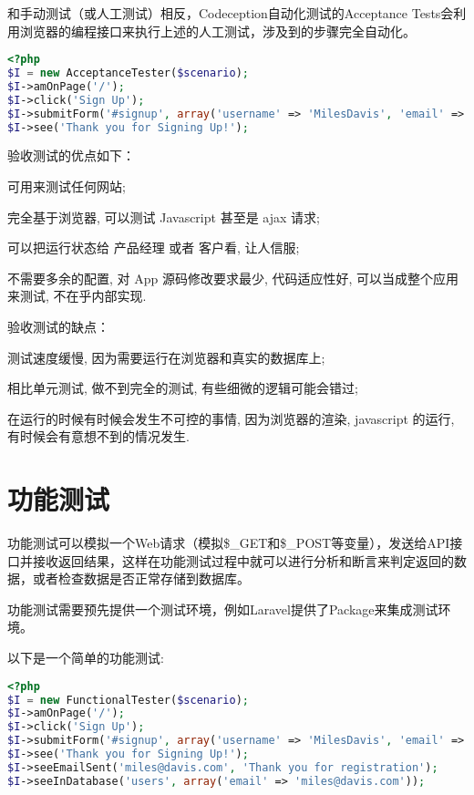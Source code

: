 和手动测试（或人工测试）相反，Codeception自动化测试的Acceptance Tests会利用浏览器的编程接口来执行上述的人工测试，涉及到的步骤完全自动化。


\begin{lstlisting}[language=PHP]
<?php
$I = new AcceptanceTester($scenario);
$I->amOnPage('/');
$I->click('Sign Up');
$I->submitForm('#signup', array('username' => 'MilesDavis', 'email' => 'miles@davis.com'));
$I->see('Thank you for Signing Up!');
\end{lstlisting}

验收测试的优点如下：

\begin{compactitem}
\item 可用来测试任何网站;
\item 完全基于浏览器, 可以测试 Javascript 甚至是 ajax 请求;
\item 可以把运行状态给 产品经理 或者 客户看, 让人信服;
\item 不需要多余的配置, 对 App 源码修改要求最少, 代码适应性好, 可以当成整个应用来测试, 不在乎内部实现.
\end{compactitem}

验收测试的缺点：

\begin{compactitem}
\item 测试速度缓慢, 因为需要运行在浏览器和真实的数据库上;
\item 相比单元测试, 做不到完全的测试, 有些细微的逻辑可能会错过;
\item 在运行的时候有时候会发生不可控的事情, 因为浏览器的渲染, javascript 的运行, 有时候会有意想不到的情况发生.
\end{compactitem}



\section{功能测试}


功能测试可以模拟一个Web请求（模拟\$\_GET和\$\_POST等变量），发送给API接口并接收返回结果，这样在功能测试过程中就可以进行分析和断言来判定返回的数据，或者检查数据是否正常存储到数据库。

功能测试需要预先提供一个测试环境，例如Laravel提供了Package来集成测试环境。

以下是一个简单的功能测试:

\begin{lstlisting}[language=PHP]
<?php
$I = new FunctionalTester($scenario);
$I->amOnPage('/');
$I->click('Sign Up');
$I->submitForm('#signup', array('username' => 'MilesDavis', 'email' => 'miles@davis.com'));
$I->see('Thank you for Signing Up!');
$I->seeEmailSent('miles@davis.com', 'Thank you for registration');
$I->seeInDatabase('users', array('email' => 'miles@davis.com'));
\end{lstlisting}


